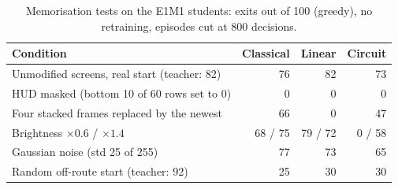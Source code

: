 \documentclass[10pt, a4paper]{article}
\begin{document}
\begin{itemize}
\end{itemize}

\begin{table}[htbp]
\centering
\footnotesize
\renewcommand{\arraystretch}{1.1}
\caption{Memorisation tests on the E1M1 students: exits out of 100 (greedy), no retraining, episodes cut at 800 decisions.}
\label{tab:robust}
\begin{tabularx}{\textwidth}{Xrrr}
\toprule
\textbf{Condition} & \textbf{Classical} & \textbf{Linear} & \textbf{Circuit} \\
\midrule
Unmodified screens, real start (teacher: 82) & 76 & 82 & 73 \\
HUD masked (bottom 10 of 60 rows set to 0) & 0 & 0 & 0 \\
Four stacked frames replaced by the newest & 66 & 0 & 47 \\
Brightness $\times0.6$ / $\times1.4$ & 68 / 75 & 79 / 72 & 0 / 58 \\
Gaussian noise (std 25 of 255) & 77 & 73 & 65 \\
Random off-route start (teacher: 92) & 25 & 30 & 30 \\
\bottomrule
\end{tabularx}
\end{table}
\end{document}
